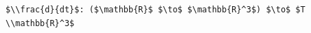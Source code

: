 \documentclass[border=10pt]{standalone}
\begin{document}
\begin{lstlisting}
$\\frac{d}{dt}$: ($\mathbb{R}$ $\to$ $\mathbb{R}^3$) $\to$ $T \\mathbb{R}^3$
\end{lstlisting}
\end{document}
